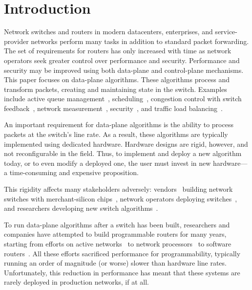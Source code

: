 \section{Introduction}
\label{s:intro}

Network switches and routers in modern datacenters, enterprises, and
service-provider networks perform many tasks in addition to standard
packet forwarding. The set of requirements for routers has only
increased with time as network operators seek greater control over
performance and security.  Performance and security may be improved
using both data-plane and control-plane mechanisms. This paper focuses
on data-plane algorithms. These algorithms process and transform
packets, creating and maintaining state in the switch. Examples
include active queue management~\cite{red,blue,avq,codel,pie},
scheduling~\cite{pifo_hotnets}, congestion control with switch
feedback~\cite{xcp, rcp, pdq, dctcp}, network
measurement~\cite{opensketch, bitmap_george, elephant_george},
security~\cite{dns_change}, and traffic load balancing~\cite{conga}.

An important requirement for data-plane algorithms is the ability to
process packets at the switch's line rate.  As a result, these
algorithms are typically implemented using dedicated
hardware. Hardware designs are rigid, however, and not reconfigurable
in the field. Thus, to implement and deploy a new algorithm today, or
to even modify a deployed one, the user must invest in new
hardware---a time-consuming and expensive proposition.

This rigidity affects many stakeholders adversely:
vendors~\cite{cisco_nexus, dell_force10, arista_7050} building network
switches with merchant-silicon chips~\cite{trident, tomahawk,
  mellanox}, network operators deploying
switches~\cite{google,facebook,vl2}, and researchers developing new
switch algorithms~\cite{xcp, codel, d3, detail, pdq}.  

To run data-plane algorithms after a switch has been built,
researchers and companies have attempted to build programmable routers
for many years, starting from efforts on active
networks~\cite{active-nets} to network processors~\cite{npu_survey} to
software routers~\cite{click, dpdk, routebricks}. All these efforts
sacrificed performance for programmability, typically running an order
of magnitude (or worse) slower than hardware line
rates. Unfortunately, this reduction in performance has meant that
these systems are rarely deployed in production networks, if at all.

